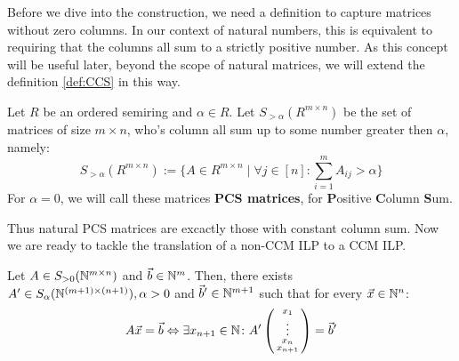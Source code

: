 Before we dive into the construction, we need a definition to capture matrices without zero columns. In our context of natural numbers, this is equivalent to requiring that the columns all sum to a strictly positive number. As this concept will be useful later, beyond the scope of natural matrices, we will extend the definition \ref{def:CCS} in this way.

\begin{definition}
    \label{def:PCS}
    Let $R$ be an ordered semiring and $\alpha \in R$. Let $S_{>\alpha}(R^{m \times n})$ be the set of matrices of size $m \times n$, who's column all sum up to some number greater then $\alpha$, namely:
    $$S_{>\alpha}(R^{m \times n}) := \{A \in R^{m \times n}\mid \forall j \in [n]\colon \sum_{i=1}^{m} A_{ij} > \alpha\}$$
    For $\alpha = 0$, we will call these matrices \textbf{PCS matrices}, for \textbf{P}ositive \textbf{C}olumn \textbf{S}um.
\end{definition}

Thus natural PCS matrices are excactly those with constant column sum. Now we are ready to tackle the translation of a non-CCM ILP to a CCM ILP.

\begin{theorem}
    \label{theorem:column_sum_construction}
    Let $A\in S_{>0}(\mathbb{N}^{m \times n})$ and $\vec b \in \mathbb{N}^m$. Then, there exists $A' \in S_\alpha(\mathbb{N}^{(m+1) \times (n+1)}), \alpha > 0$ and $\vec b' \in \mathbb{N}^{m+1}$ such that for every $\vec x \in \mathbb{N}^n$:
    $$A\vec x = \vec b \Leftrightarrow \exists x_{n+1}\in \mathbb{N}\colon A' \left(\begin{smallmatrix}
        x_1\\
        \vdots\\
        x_n\\
        x_{n+1}
    \end{smallmatrix}\right) = \vec b'$$
\end{theorem}

